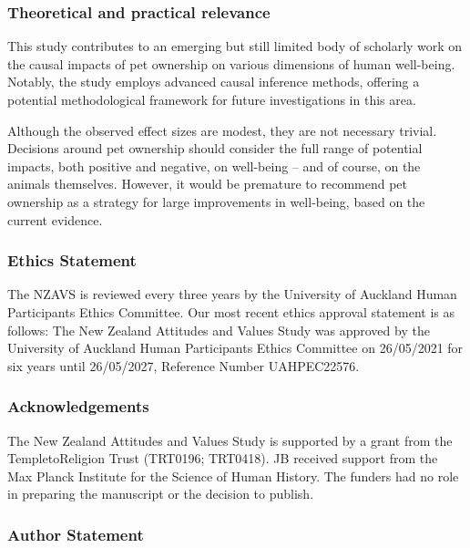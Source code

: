 \documentclass[
  singlecolumn,
  9pt]{article}
\begin{document}
\subsubsection{Theoretical and practical
relevance}\label{theoretical-and-practical-relevance}

This study contributes to an emerging but still limited body of
scholarly work on the causal impacts of pet ownership on various
dimensions of human well-being. Notably, the study employs advanced
causal inference methods, offering a potential methodological framework
for future investigations in this area.

Although the observed effect sizes are modest, they are not necessary
trivial. Decisions around pet ownership should consider the full range
of potential impacts, both positive and negative, on well-being -- and
of course, on the animals themselves. However, it would be premature to
recommend pet ownership as a strategy for large improvements in
well-being, based on the current evidence.

\newpage{}

\subsubsection{Ethics Statement}\label{ethics-statement}

The NZAVS is reviewed every three years by the University of Auckland
Human Participants Ethics Committee. Our most recent ethics approval
statement is as follows: The New Zealand Attitudes and Values Study was
approved by the University of Auckland Human Participants Ethics
Committee on 26/05/2021 for six years until 26/05/2027, Reference Number
UAHPEC22576.

\subsubsection{Acknowledgements}\label{acknowledgements}

The New Zealand Attitudes and Values Study is supported by a grant from
the TempletoReligion Trust (TRT0196; TRT0418). JB received support from
the Max Planck Institute for the Science of Human History. The funders
had no role in preparing the manuscript or the decision to publish.

\subsubsection{Author Statement}\label{author-statement}
\end{document}
